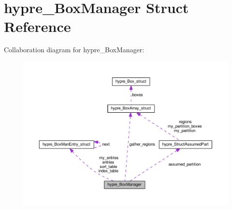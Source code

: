 \hypertarget{structhypre__BoxManager}{}\section{hypre\+\_\+\+Box\+Manager Struct Reference}
\label{structhypre__BoxManager}


Collaboration diagram for hypre\+\_\+\+Box\+Manager\+:
\nopagebreak
\begin{figure}[H]
\begin{center}
\leavevmode
\includegraphics[width=350pt]{structhypre__BoxManager__coll__graph}
\end{center}
\end{figure}
